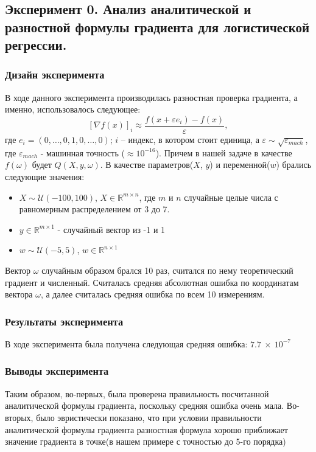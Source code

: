 \subsection{Эксперимент 0. Анализ  аналитической и разностной формулы градиента  для логистической регрессии.}
\subsubsection{Дизайн эксперимента}
В ходе данного эксперимента производилась разностная проверка градиента, а именно, использовалось следующее:
	$$
		[\nabla f(x)]_i \approx \frac{f(x + \varepsilon e_i) - f(x)}{\varepsilon},
	$$
	где $e_i = (0,\dots,0,1,0,\dots,0)$; $i$ --  индекс, в котором стоит единица, а
	$\varepsilon \sim \sqrt{\varepsilon_{mach}}$, где $\varepsilon_{mach}$ - машинная точность ($\approx\!10^{-16}$). Причем в нашей задаче в качестве
	$f(\omega)$ будет $Q(X, y, \omega)$. В качестве параметров($X$, $y$) и переменной($w$) брались следующие значения:
	\begin{itemize}
		\item $X \sim \mathcal{U}(-100, 100)$, $X \in \mathbb{R}^{m \times n}$, где $m$ и $n$ случайные целые числа с равномерным распределением от 3 до 7.
		\item $y \in \mathbb{R}^{m \times 1}$ -  случайный вектор из -1 и 1 
		\item $w \sim \mathcal{U}(-5, 5)$, $w \in \mathbb{R}^{n \times 1}$
	\end{itemize}
	Вектор $\omega$ случайным образом брался 10 раз, считался по нему теоретический градиент и численный. Считалась средняя абсолютная ошибка по координатам вектора $\omega$, а далее считалась средняя  ошибка по всем 10 измерениям.
\subsubsection{Результаты эксперимента}
В ходе эксперимента была получена следующая средняя ошибка: $7.7~\times~10^{-7}$
\subsubsection{Выводы эксперимента}
Таким образом, во-первых, была проверена правильность посчитанной аналитической формулы градиента, поскольку средняя ошибка очень мала. Во-вторых, было эвристически показано, что при условии правильности аналитической формулы градиента разностная формула хорошо приближает значение градиента в точке(в нашем примере с точностью до 5-го порядка)
